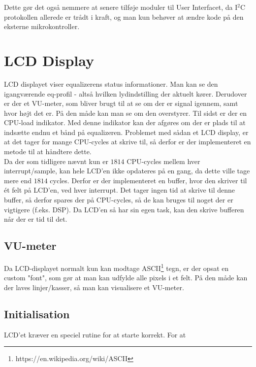 Dette gør det også nemmere at senere tilføje moduler til User Interfacet, da I$^2$C protokollen allerede er trådt i kraft, og man kun behøver at ændre kode på den eksterne mikrokontroller.

\section{LCD Display}\label{sec:lcd}
LCD displayet viser equalizerens status informationer. Man kan se den igangværende eq-profil - altså hvilken lydindstilling der aktuelt kører. Derudover er der et VU-meter, som bliver brugt til at se om der er signal igennem, samt hvor højt det er. På den måde kan man se om den overstyrer. Til sidst er der en CPU-load indikator. Med denne indikator kan der afgøres om der er plads til at indsætte endnu et bånd på equalizeren. Problemet med sådan et LCD display, er at det tager for mange CPU-cycles at skrive til, så derfor er der implementeret en metode til at håndtere dette. \\

Da der som tidligere nævnt kun er $1814$ CPU-cycles mellem hver interrupt/sample, kan hele LCD'en ikke opdateres på en gang, da dette ville tage mere end $1814$ cycles. Derfor er der implementeret en buffer, hvor den skriver til ét felt på LCD'en, ved hver interrupt. Det tager ingen tid at skrive til denne buffer, så derfor spares der på CPU-cycles, så de kan bruges til noget der er vigtigere (f.eks. DSP). Da LCD'en så har sin egen task, kan den skrive bufferen når der er tid til det. \\

\subsection{VU-meter}
Da LCD-displayet normalt kun kan modtage ASCII\footnote{https://en.wikipedia.org/wiki/ASCII} tegn, er der opsat en custom "font", som gør at man kan udfylde alle pixels i et felt. På den måde kan der laves linjer/kasser, så man kan visualisere et VU-meter. 

\subsection{Initialisation}
LCD'et kræver en speciel rutine for at starte korrekt. For at